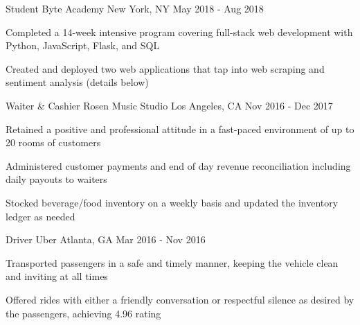 

\begin{cventries}

  \cventry
    {Student} %
    {Byte Academy} %
    {New York, NY} %
    {May 2018 - Aug 2018} %
    {
      \begin{cvitems} %
        \item {Completed a 14-week intensive program covering full-stack web development with Python, JavaScript, Flask, and SQL}
        \item {Created and deployed two web applications that tap into web scraping and sentiment analysis (details below)}
      \end{cvitems}
    }

  \cventry
    {Waiter \& Cashier} %
    {Rosen Music Studio} %
    {Los Angeles, CA} %
    {Nov 2016 - Dec 2017} %
    {
      \begin{cvitems} %
        \item {Retained a positive and professional attitude in a fast-paced environment of up to 20 rooms of customers}
        \item {Administered customer payments and end of day revenue reconciliation including daily payouts to waiters}
        \item {Stocked beverage/food inventory on a weekly basis and updated the inventory ledger as needed}
      \end{cvitems}
    }

  \cventry
    {Driver} %
    {Uber} %
    {Atlanta, GA} %
    {Mar 2016 - Nov 2016} %
    {
      \begin{cvitems} %
        \item {Transported passengers in a safe and timely manner, keeping the vehicle clean and inviting at all times}
        \item {Offered rides with either a friendly conversation or respectful silence as desired by the passengers, achieving 4.96 rating}
      \end{cvitems}
    }


\end{cventries}

